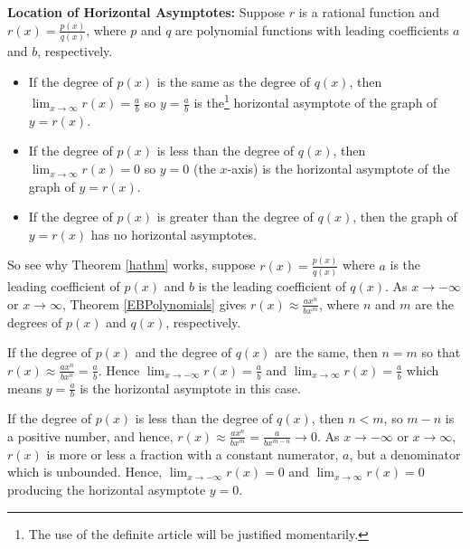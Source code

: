 \documentclass{ximera}
\begin{document}
\begin{theorem} \textbf{Location of Horizontal Asymptotes:}\label{hathm} Suppose $r$ is a rational function and $r(x) = \frac{p(x)}{q(x)}$, where $p$ and $q$ are polynomial functions with leading coefficients $a$ and $b$, respectively. 

\begin{itemize}

\item  If the degree of $p(x)$ is the same as the degree of $q(x)$, then $\lim_{x \rightarrow \infty} r(x) =\frac{a}{b}$ so $y=\frac{a}{b}$ is the\footnote{The use of the definite article will be justified momentarily.} horizontal asymptote of the graph of $y=r(x)$.

\item  If the degree of $p(x)$ is less than the degree of $q(x)$, then $\lim_{x \rightarrow \infty} r(x) =0$  so $y=0$ (the $x$-axis) is the horizontal asymptote of the graph of $y=r(x)$.

\item  If the degree of $p(x)$ is greater than the degree of $q(x)$, then the graph of $y=r(x)$ has no horizontal asymptotes.


\end{itemize}
\end{theorem}




So see why Theorem \ref{hathm} works, suppose $r(x) = \frac{p(x)}{q(x)}$ where $a$ is the leading coefficient of $p(x)$ and $b$ is the leading coefficient of $q(x)$. As $x \rightarrow  -\infty$ or $x \rightarrow \infty$,  Theorem \ref{EBPolynomials} gives $r(x) \approx \frac{ax^n}{bx^m}$, where $n$ and $m$ are the degrees of $p(x)$ and $q(x)$, respectively. 

If the degree of $p(x)$ and the degree of $q(x)$ are the same, then $n=m$ so that $r(x) \approx \frac{ax^n}{bx^n} = \frac{a}{b}$.  Hence $\lim_{x \rightarrow  -\infty} r(x) =\frac{a}{b}$  and $\lim_{x \rightarrow  \infty} r(x) =\frac{a}{b}$ which means $y=\frac{a}{b}$ is the horizontal asymptote in this case.  

If the degree of $p(x)$ is less than the degree of $q(x)$, then $n < m$, so $m-n$ is a positive number, and hence, $r(x) \approx  \frac{ax^n}{bx^m}  = \frac{a}{bx^{m-n}} \rightarrow 0$.   As $x \rightarrow  -\infty$ or $x \rightarrow \infty$, $r(x)$ is more or less a fraction with a constant numerator, $a$, but a denominator which is unbounded. Hence, $\lim_{x \rightarrow  -\infty} r(x) = 0$ and $\lim_{x \rightarrow  \infty} r(x) = 0$  producing the horizontal asymptote $y = 0$.   
\end{document}
